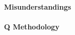 \documentclass[11pt,a4paper,oneside,english]{article}
\begin{document}
\paragraph{Misunderstandings}




\paragraph{Q Methodology}



\end{document}
